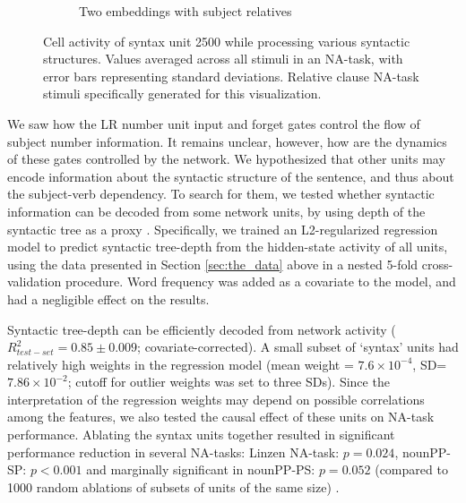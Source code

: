 \begin{figure}[t]
\begin{subfigure}{\textwidth}
            \caption{Two embeddings with subject relatives}
            \label{fig:syntax-unit-double-subjrel}
    \end{subfigure}
\caption{Cell activity of syntax unit \unit{2}{500} while processing various syntactic structures. Values averaged across all stimuli in an NA-task, with error bars representing standard deviations. Relative clause NA-task stimuli specifically generated for this visualization. }
\end{figure}

We saw how the LR number unit input and forget gates control the flow
of subject number information. It remains unclear, however, how are
the dynamics of these gates controlled by the network. We hypothesized
that other units may encode information about the syntactic structure
of the sentence, and thus about the subject-verb dependency. To
search for them, we tested whether syntactic information can be
decoded from some network units, by using depth of the
syntactic tree as a proxy \cite{Nelson:etal:2017}. Specifically, we
trained an L2-regularized regression model to predict syntactic
tree-depth from the hidden-state activity of all units, using the data
presented in Section \ref{sec:the_data} above in a nested 5-fold
cross-validation procedure. %
Word frequency was added as a covariate
to the model, and had a negligible effect on the results.

Syntactic tree-depth can be efficiently decoded from network activity
($R^2_{test-set}=0.85\pm0.009$; covariate-corrected). A small subset of `syntax' units had relatively high weights in the regression model (mean weight = $7.6\times{}10^{-4}$, SD=$7.86\times{}10^{-2}$; cutoff for outlier weights was set to three SDs). Since the interpretation of the regression weights may depend on possible correlations among the features, we also tested the causal effect of these units on NA-task performance. Ablating the syntax units together resulted in significant performance reduction in several NA-tasks: Linzen NA-task: $p=0.024$, nounPP-SP: $p<0.001$ and marginally significant in nounPP-PS: $p=0.052$ (compared to 1000 random ablations of subsets of units of the same size) .

